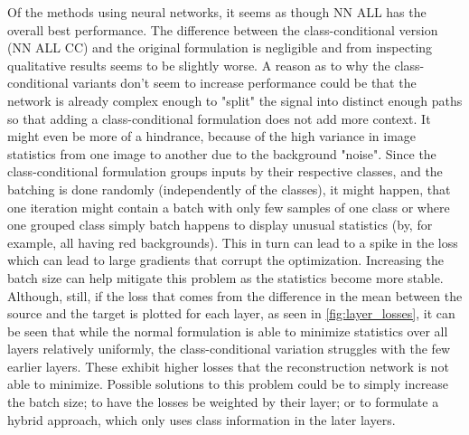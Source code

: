 Of the methods using neural networks, it seems as though NN ALL has the overall best performance.
The difference between the class-conditional version (NN ALL CC) and the original formulation is negligible
and from inspecting qualitative results seems to be slightly worse.
A reason as to why the class-conditional variants don't seem to increase performance could be that 
the network is already complex enough to "split" the signal into distinct enough paths so that adding
a class-conditional formulation does not add more context.
It might even be more of a hindrance, because of the high variance in image statistics
from one image to another due to the background "noise".
Since the class-conditional formulation groups inputs by their respective classes, 
and the batching is done randomly (independently of the classes), it might happen, that one iteration
might contain a batch with only few samples of one class or where one grouped class simply batch happens
to display unusual statistics (by, for example, all having red backgrounds).
This in turn can lead to a spike in the loss which can lead to large gradients that corrupt the optimization.
Increasing the batch size can help mitigate this problem as the statistics become more stable.
Although, still, if the loss that comes from the difference in the mean between the source and the target 
is plotted for each layer, as seen in \ref{fig:layer_losses}, it can be seen that while the
normal formulation is able to minimize statistics over all layers relatively uniformly,
the class-conditional variation struggles with the few earlier layers.
These exhibit higher losses that the reconstruction network is not able to minimize.
Possible solutions to this problem could be to simply increase the batch size;
to have the losses be weighted by their layer; or to formulate a hybrid approach, which
only uses class information in the later layers.

